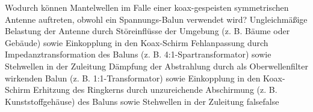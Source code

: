     {Wodurch können Mantelwellen im Falle einer koax-gespeisten symmetrischen Antenne auftreten, obwohl ein Spannungs-Balun verwendet wird?}
    {Ungleichmäßige Belastung der Antenne durch Störeinflüsse der Umgebung (z. B. Bäume oder Gebäude) sowie Einkopplung in den Koax-Schirm}
    {Fehlanpassung durch Impedanztransformation des Baluns (z. B. 4:1-Spartransformator) sowie Stehwellen in der Zuleitung}
    {Dämpfung der Abstrahlung durch als Oberwellenfilter wirkenden Balun (z. B. 1:1-Transformator) sowie Einkopplung in den Koax-Schirm}
    {Erhitzung des Ringkerns durch unzureichende Abschirmung (z. B. Kunststoffgehäuse) des Baluns sowie Stehwellen in der Zuleitung}
    {false}{false}